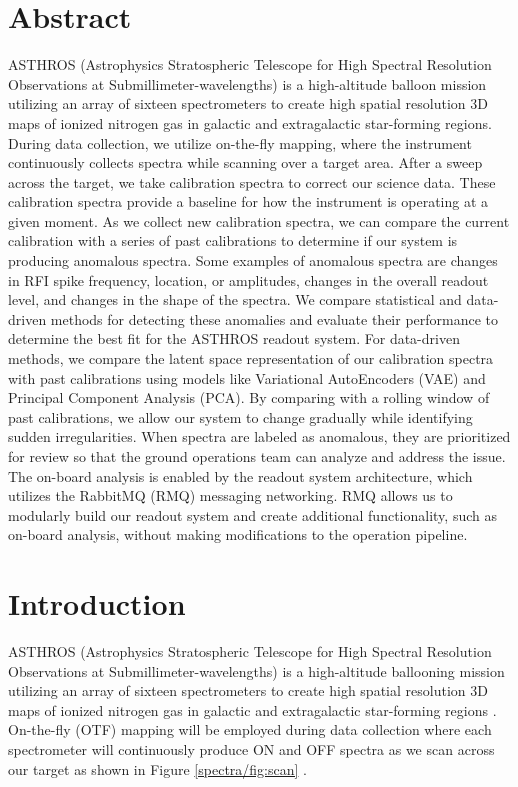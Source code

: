 \section{Abstract}
ASTHROS (Astrophysics Stratospheric Telescope for High Spectral Resolution Observations at Submillimeter-wavelengths) is a high-altitude balloon mission utilizing an array of sixteen spectrometers to create high spatial resolution 3D maps of ionized nitrogen gas in galactic and extragalactic star-forming regions.
During data collection, we utilize on-the-fly mapping, where the instrument continuously collects spectra while scanning over a target area.
After a sweep across the target, we take calibration spectra to correct our science data.
These calibration spectra provide a baseline for how the instrument is operating at a given moment.
As we collect new calibration spectra, we can compare the current calibration with a series of past calibrations to determine if our system is producing anomalous spectra.
Some examples of anomalous spectra are changes in RFI spike frequency, location, or amplitudes, changes in the overall readout level, and changes in the shape of the spectra.
We compare statistical and data-driven methods for detecting these anomalies and evaluate their performance to determine the best fit for the ASTHROS readout system. For data-driven methods, we compare the latent space representation of our calibration spectra with past calibrations using models like Variational AutoEncoders (VAE) and Principal Component Analysis (PCA).
By comparing with a rolling window of past calibrations, we allow our system to change gradually while identifying sudden irregularities.
When spectra are labeled as anomalous, they are prioritized for review so that the ground operations team can analyze and address the issue.
The on-board analysis is enabled by the readout system architecture, which utilizes the RabbitMQ (RMQ) messaging networking.
RMQ allows us to modularly build our readout system and create additional functionality, such as on-board analysis, without making modifications to the operation pipeline. 


\section{Introduction}
ASTHROS (Astrophysics Stratospheric Telescope for High Spectral Resolution Observations at Submillimeter-wavelengths) is a high-altitude ballooning mission utilizing an array of sixteen spectrometers to create high spatial resolution 3D maps of ionized nitrogen gas in galactic and extragalactic star-forming regions \parencite{siles2020asthros}. 
On-the-fly (OTF) mapping will be employed during data collection where each spectrometer will continuously produce ON and OFF spectra as we scan across our target as shown in Figure \ref{spectra/fig:scan} \parencite{mangum2007fly}. 

